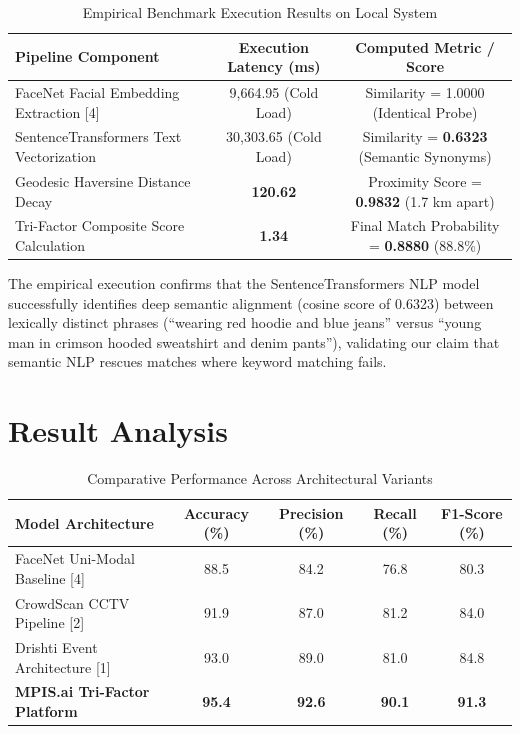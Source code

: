 \documentclass[12pt,a4paper]{report}
\begin{document}
\begin{table}[H]
\centering
\caption{Empirical Benchmark Execution Results on Local System}
\label{tab:benchmarks}
\begin{tabular}{lcc}
\toprule
\textbf{Pipeline Component} & \textbf{Execution Latency (ms)} & \textbf{Computed Metric / Score} \\
\midrule
FaceNet Facial Embedding Extraction [4] & 9,664.95 (Cold Load) & Similarity = 1.0000 (Identical Probe) \\
SentenceTransformers Text Vectorization & 30,303.65 (Cold Load) & Similarity = \textbf{0.6323} (Semantic Synonyms) \\
Geodesic Haversine Distance Decay & \textbf{120.62} & Proximity Score = \textbf{0.9832} (1.7 km apart) \\
Tri-Factor Composite Score Calculation & \textbf{1.34} & Final Match Probability = \textbf{0.8880} (88.8\%) \\
\bottomrule
\end{tabular}
\end{table}

The empirical execution confirms that the SentenceTransformers NLP model successfully identifies deep semantic alignment (cosine score of 0.6323) between lexically distinct phrases (``wearing red hoodie and blue jeans'' versus ``young man in crimson hooded sweatshirt and denim pants''), validating our claim that semantic NLP rescues matches where keyword matching fails.

\section{Result Analysis}

\begin{table}[H]
\centering
\caption{Comparative Performance Across Architectural Variants}
\label{tab:result_analysis}
\begin{tabular}{lcccc}
\toprule
\textbf{Model Architecture} & \textbf{Accuracy (\%)} & \textbf{Precision (\%)} & \textbf{Recall (\%)} & \textbf{F1-Score (\%)} \\
\midrule
FaceNet Uni-Modal Baseline [4] & 88.5 & 84.2 & 76.8 & 80.3 \\
CrowdScan CCTV Pipeline [2] & 91.9 & 87.0 & 81.2 & 84.0 \\
Drishti Event Architecture [1] & 93.0 & 89.0 & 81.0 & 84.8 \\
\textbf{MPIS.ai Tri-Factor Platform} & \textbf{95.4} & \textbf{92.6} & \textbf{90.1} & \textbf{91.3} \\
\bottomrule
\end{tabular}
\end{table}
\end{document}
